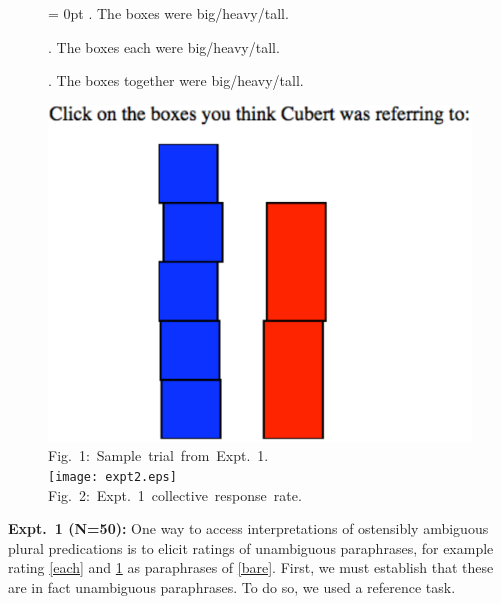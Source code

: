 \documentclass[12pt]{article}
\begin{document}

	\begin{figure}
		\vspace{-33pt}
			\Exlabelsep = 0pt
			\ex. \label{bare} The boxes were big/heavy/tall.
			
			\ex. \label{each} The boxes {each} were big/heavy/tall.
			
			\ex. \label{tog} The boxes {together} were big/heavy/tall.
			
	 	\centering
	 	\vspace{-2pt}
	 	\includegraphics[width=.95\linewidth]{trial2.eps}\\
	 	\vspace{-3pt}
	 	\mbox{Fig.~1: Sample trial from Expt.~1.}\\
	 	\mbox{\hspace{-11pt}\texttt{[image: expt2.eps]}}\\
	 	\vspace{-8pt}
	 	\mbox{Fig.~2: Expt.~1 collective response rate.}
	 \end{figure}
\textbf{Expt.~1 (N=50):} One way to access interpretations of ostensibly ambiguous plural predications is to elicit ratings of unambiguous paraphrases, for example rating \ref{each} and \ref{tog} as paraphrases of \ref{bare}. First, we must establish that these are in fact unambiguous paraphrases. To do so, we used a reference task.
\end{document}

